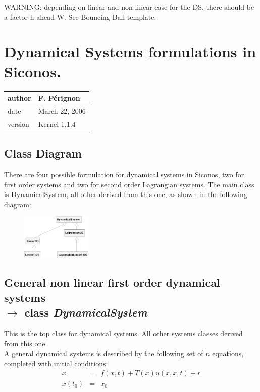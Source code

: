 \documentclass[10pt]{report}
\begin{document}
WARNING: depending on linear and non linear case for the DS, there should be a factor h ahead W. See Bouncing Ball template. 

\chapter{Dynamical Systems formulations in Siconos.}

\begin{table}[!ht]
  \begin{tabular}{|l|l|}
    \hline
    author  & F. P\'erignon \\
    \hline
    date    & March 22, 2006 \\ 
    \hline
    version & Kernel 1.1.4 \\
    \hline
  \end{tabular}
\end{table}


\section{Class Diagram}
There are four possible formulation for dynamical systems in Siconos,
two for first order systems and two for second order Lagrangian systems. The main class is DynamicalSystem, all other derived from this one, as shown in the following diagram:
\begin{figure}[htbp]
  \centering
 \includegraphics[width=0.3\textwidth]{./DSClassDiagram.eps}
  \label{DSDiagram}
\end{figure}
\section{General non linear first order dynamical systems \\ $\rightarrow$ class \it{DynamicalSystem}}
This is the top class for dynamical systems. All other systems classes derived from this one. \\

A general dynamical systems is described by the following set of $n$ equations, completed with initial conditions:
\begin{eqnarray}
  \dot x &=& f(x,t) + T(x) u(x, \dot x, t) + r \\
  x(t_0)&=&x_0 
\end{eqnarray}
\end{document}
